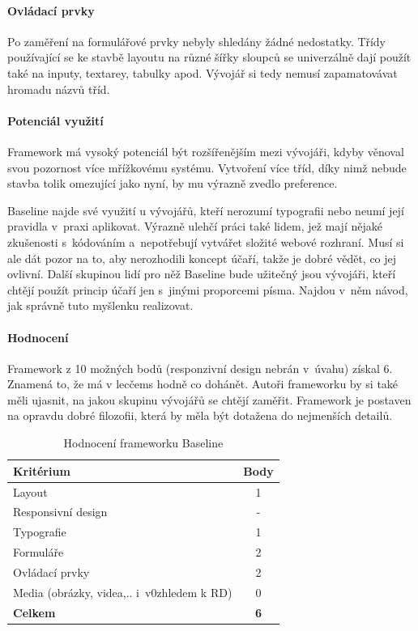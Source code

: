 \documentclass[thesis=B,czech]{FITthesis}[2012/06/26]
\begin{document}
\paragraph{Ovládací prvky}

Po zaměření na formulářové prvky nebyly shledány žádné nedostatky. Třídy používající se ke stavbě layoutu na různé šířky sloupců se univerzálně dají použít také na inputy, textarey, tabulky apod. Vývojář si tedy nemusí zapamatovávat hromadu názvů tříd.

\paragraph{Potenciál využití}

Framework má vysoký potenciál být rozšířenějším mezi vývojáři, kdyby věnoval svou pozornost více mřížkovému systému. Vytvoření více tříd, díky nimž nebude stavba tolik omezující jako nyní, by mu výrazně zvedlo preference.

Baseline najde své využití u vývojářů, kteří nerozumí typografii nebo neumí její pravidla v~praxi aplikovat. Výrazně ulehčí práci také lidem, jež mají nějaké zkušenosti s~kódováním a~nepotřebují vytvářet složité webové rozhraní. Musí si ale dát pozor na to, aby nerozhodili koncept účaří, takže je dobré vědět, co jej ovlivní. Další skupinou lidí pro něž Baseline bude užitečný jsou vývojáři, kteří chtějí použít princip účaří jen s~jinými proporcemi písma. Najdou v~něm návod, jak správně tuto myšlenku realizovat.
\paragraph{Hodnocení}

Framework z 10 možných bodů (responzivní design nebrán v~úvahu) získal 6. Znamená to, že má v lecčems hodně co dohánět. Autoři frameworku by si také měli ujasnit, na jakou skupinu vývojářů se chtějí zaměřit. Framework je postaven na opravdu dobré filozofii, která by měla být dotažena do nejmenších detailů. 

\begin{table}[h]\centering
 	\caption[Hodnocení Baseline]{Hodnocení frameworku Baseline}\label{tab:baseline}
 	\begin{tabular}{|l|c|}\hline
 	\textbf{Kritérium} & \textbf{Body}\tabularnewline
 	\hline\hline
		Layout & 1\tabularnewline
		\hline 
		 Responsivní design & -\tabularnewline
		\hline 
		Typografie & 1\tabularnewline
		\hline 
		Formuláře & 2\tabularnewline
		\hline 
		Ovládací prvky & 2\tabularnewline
		\hline 
		Media  (obrázky, videa,.. i~v0zhledem k RD) & 0\tabularnewline
		\hline 
		\textbf{Celkem} & \textbf{6}\tabularnewline
		\hline 
 	\end{tabular}
\end{table} 
\end{document}
